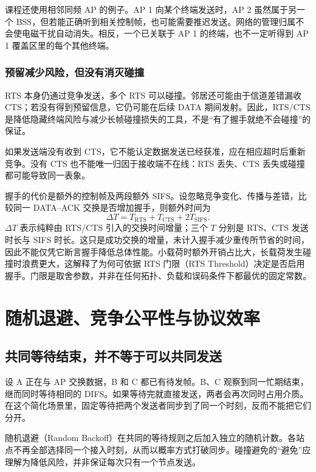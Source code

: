 课程还使用相邻同频 AP 的例子。AP 1 向某个终端发送时，AP 2 虽然属于另一个 BSS，但若能正确听到相关控制帧，也可能需要推迟发送。网络的管理归属不会使电磁干扰自动消失。相反，一个已关联于 AP 1 的终端，也不一定听得到 AP 1 覆盖区里的每个其他终端。

\subsubsection{预留减少风险，但没有消灭碰撞}

RTS 本身仍通过竞争发送，多个 RTS 可以碰撞。邻居还可能由于信道差错漏收 CTS；若没有得到预留信息，它仍可能在后续 DATA 期间发射。因此，RTS/CTS 是降低隐藏终端风险与减少长帧碰撞损失的工具，不是“有了握手就绝不会碰撞”的保证。

如果发送端没有收到 CTS，它不能认定数据发送已经获准，应在相应超时后重新竞争。没有 CTS 也不能唯一归因于接收端不在线：RTS 丢失、CTS 丢失或碰撞都可能导致同一表象。

握手的代价是额外的控制帧及两段额外 SIFS。设忽略竞争变化、传播与差错，比较同一 DATA--ACK 交换是否增加握手，则额外时间为
\begin{equation}
\Delta T=T_{\mathrm{RTS}}+T_{\mathrm{CTS}}+2T_{\mathrm{SIFS}}.
\label{eq:rts-overhead}
\end{equation}
$\Delta T$ 表示纯粹由 RTS/CTS 引入的交换时间增量；三个 $T$ 分别是 RTS、CTS 发送时长与 SIFS 时长。这只是成功交换的增量，未计入握手减少重传所节省的时间，因此不能仅凭它断言握手降低总体性能。小载荷时额外开销占比大，长载荷发生碰撞时浪费更大，这解释了为何可依据 RTS 门限（RTS Threshold）决定是否启用握手。门限是取舍参数，并非在任何拓扑、负载和误码条件下都最优的固定常数。

\section{随机退避、竞争公平性与协议效率}
\label{ch:backoff-fairness}

\subsection{共同等待结束，并不等于可以共同发送}

设 A 正在与 AP 交换数据，B 和 C 都已有待发帧。B、C 观察到同一忙期结束，继而同时等待相同的 DIFS。如果等待完就直接发送，两者会再次同时占用介质。在这个简化场景里，固定等待把两个发送者同步到了同一个时刻，反而不能把它们分开。

随机退避（Random Backoff）在共同的等待规则之后加入独立的随机计数。各站点不再全部选择同一个接入时刻，从而以概率方式打破同步。碰撞避免的“避免”应理解为降低风险，并非保证每次只有一个节点发送。

